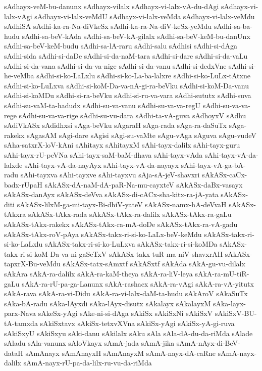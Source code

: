 {sAdhayx-veM-bu-danunx
sAdhayx-vilalx
sAdhayx-vi-lalx-vA-du-dAgi
sAdhayx-vi-lalx-vAgi
sAdhayx-vi-lalx-veMdU
sAdhayx-vi-lalx-veMda
sAdhayx-vi-lalx-veMdu
sAdhiSA
sAdhi-ka-ra-Na-diVkeSx
sAdhi-ka-ra-Na-diV-keSx-yeMdu
sAdhi-sa-ba-hudu
sAdhi-sa-beV-kAda
sAdhi-sa-beV-kA-gilalx
sAdhi-sa-beV-keM-bu-danUnx
sAdhi-sa-beV-keM-budu
sAdhi-sa-lA-raru
sAdhi-salu
sAdhisi
sAdhi-si-dAga
sAdhi-sida
sAdhi-si-daDe
sAdhi-si-da-naM-tara
sAdhi-si-dare
sAdhi-si-da-vaLu
sAdhi-si-da-vana
sAdhi-si-da-va-nige
sAdhi-si-da-vanu
sAdhi-si-dedxVne
sAdhi-si-he-veMba
sAdhi-si-ko-LaLxlu
sAdhi-si-ko-La-ba-lalxre
sAdhi-si-ko-LuLx-tAtxne
sAdhi-si-ko-LuLxva
sAdhi-si-koM-Da-va-nA-gi-ra-beVku
sAdhi-si-koM-Da-vanu
sAdhi-si-koMDu
sAdhi-si-ra-beVku
sAdhi-si-ru-va-vara
sAdhi-sututx
sAdhi-suva
sAdhi-su-vaM-ta-hadudx
sAdhi-su-va-vanu
sAdhi-su-va-va-regU
sAdhi-su-va-va-rege
sAdhi-su-va-va-rige
sAdhi-su-vu-dara
sAdhi-ta-vA-guva
sAdhoyxV
sAdhu
sAdiVkASx
sAdidhxsi
sAga-beVku
sAgaraH
sAga-rada
sAga-ra-daSuTx
sAga-rakekx
sAgasAM
sAgi-dare
sAgisi
sAgi-su-vaMte
sAgu-vAga
sAguva
sAgu-vudeV
sAha-satxrX-loV-kAni
sAhitayx
sAhitayxM
sAhi-tayx-dalilx
sAhi-tayx-guru
sAhi-tayx-rU-peVNa
sAhi-tayx-saM-baM-dhava
sAhi-tayx-vAda
sAhi-tayx-vA-da-lalxde
sAhi-tayx-vA-da-nayAyx
sAhi-tayx-vA-da-nayayx
sAhi-tayx-vA-ga-bA-radu
sAhi-tayxva
sAhi-tayxve
sAhi-tayxvu
sAja-sA-jeV-shavxri
sAkASx-caCx-badx-rUpaH
sAkASx-dA-naM-dA-paR-Na-mu-cayxteV
sAkASx-daBx-vasayx
sAkASx-danAyx
sAkASx-deVva
sAkASx-di-cACx-sha-kitx-ra-jA-yata
sAkASx-diti
sAkASx-lilxM-ga-mi-tayx-Bi-dhiV-yateV
sAkASx-namx-hA-deVvaH
sAkASx-tAkxra
sAkASx-tAkx-rada
sAkASx-tAkx-ra-dalilx
sAkASx-tAkx-ra-gaLu
sAkASx-tAkx-rakekx
sAkASx-tAkx-ra-mA-doDe
sAkASx-tAkx-ra-vA-gadu
sAkASx-tAkx-roV-pAya
sAkASx-takx-ri-si-ko-LaLx-beV-keMdu
sAkASx-takx-ri-si-ko-LaLxlu
sAkASx-takx-ri-si-ko-LuLxva
sAkASx-takx-ri-si-koMDa
sAkASx-takx-ri-si-koM-Da-va-ni-gaSeTxV
sAkASx-takx-tuR-ma-niV-shavxrAH
sAkASx-tapxrX-Bu-veMdu
sAkASx-tatx-sAmxtf
sAkASxtf
sAkAda
sAkA-gu-vu-dilalx
sAkAra
sAkA-ra-dalilx
sAkA-ra-kaM-theya
sAkA-ra-liV-leya
sAkA-ra-mU-tiR-gaLu
sAkA-ra-rU-pa-ga-Lanunx
sAkA-rashacx
sAkA-ra-vAgi
sAkA-ra-vA-yitutx
sAkA-rava
sAkA-ra-vi-Didu
sAkA-ra-vi-lalx-daM-ta-hudu
sAkAroV
sAkaSuTx
sAka-bA-radu
sAka-lAyxdi
sAka-lAyx-disutx
sAkalayx
sAkalayxM
sAka-layx-parx-Nava
sAkeSx-yAgi
sAke-ni-si-dAga
sAkiSx
sAkiSxNi
sAkiSxV
sAkiSxV-BU-tA-tamxda
sAkiSxtavx
sAkiSx-tetxvXVna
sAkiSx-yAgi
sAkiSx-yA-gi-ruva
sAkiSxyU
sAkiSxyu
sAki-danu
sAkilalx
sAku
sAla
sAla-dA-du-da-riMda
sAlade
sAladu
sAla-vanunx
sAloVkayx
sAmA-jada
sAmA-jika
sAmA-nAyx-di-BeV-dataH
sAmAnayx
sAmAnayxH
sAmAnayxM
sAmA-nayx-dA-caRne
sAmA-nayx-dalilx
sAmA-nayx-rU-pa-da-lilx-ru-vu-da-riMda
}
